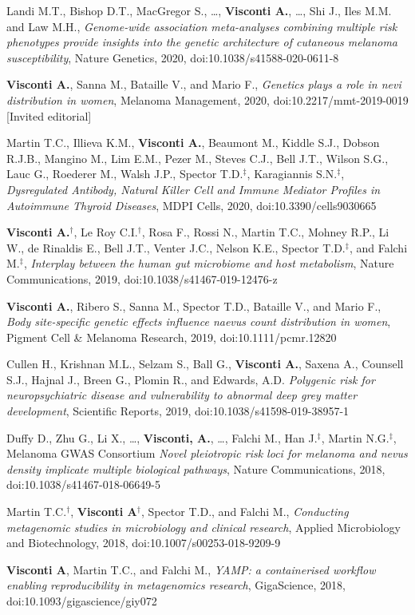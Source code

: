 \documentclass[a4paper,10pt]{article}
\begin{document}
{\begin{itemize}
		 Landi M.T., Bishop D.T., MacGregor S., \dots, \textbf{Visconti A.}, \dots, Shi J., Iles M.M. and Law M.H., \emph{Genome-wide association meta-analyses combining multiple risk phenotypes provide insights into the genetic architecture of cutaneous melanoma susceptibility}, Nature Genetics, 2020, doi:10.1038/s41588-020-0611-8

		 \textbf{Visconti A.}, Sanna M., Bataille V., and Mario F., \emph{Genetics plays a role in nevi distribution in women}, Melanoma Management, 2020, doi:10.2217/mmt-2019-0019 [Invited editorial]

		 Martin T.C., Illieva K.M., \textbf{Visconti A.}, Beaumont M., Kiddle S.J., Dobson R.J.B., Mangino M., Lim E.M., Pezer M., Steves C.J., Bell J.T., Wilson S.G., Lauc G., Roederer M., Walsh J.P., Spector T.D.$^{\textbf{$\ddag $}}$, Karagiannis S.N.$^{\textbf{$\ddag $}}$, \emph{Dysregulated Antibody, Natural Killer Cell and Immune Mediator Profiles in Autoimmune Thyroid Diseases}, MDPI Cells, 2020, doi:10.3390/cells9030665
		
		 \textbf{Visconti A.}$^{\textbf{$\dag $}}$, Le Roy C.I.$^{\textbf{$\dag $}}$, Rosa F., Rossi N., Martin T.C., Mohney R.P., Li W., de Rinaldis E., Bell J.T., Venter J.C., Nelson K.E., Spector T.D.$^{\textbf{$\ddag $}}$, and Falchi M.$^{\textbf{$\ddag $}}$, \emph{Interplay between the human gut microbiome and host metabolism}, Nature Communications, 2019, doi:10.1038/s41467-019-12476-z

		 \textbf{Visconti A.}, Ribero S., Sanna M., Spector T.D., Bataille V., and Mario F., \emph{Body site-specific genetic effects influence naevus count distribution in women}, Pigment Cell \& Melanoma Research, 2019, doi:10.1111/pcmr.12820
		
		 Cullen H., Krishnan M.L., Selzam S., Ball G., \textbf{Visconti A.}, Saxena A., Counsell S.J., Hajnal J., Breen G., Plomin R., and Edwards, A.D. \emph{Polygenic risk for neuropsychiatric disease and vulnerability to abnormal deep grey matter development}, Scientific Reports, 2019, doi:10.1038/s41598-019-38957-1
		
		 Duffy D., Zhu G., Li X., \dots, \textbf{Visconti, A.}, \dots, Falchi M., Han J.$^{\textbf{$\ddag $}}$, Martin N.G.$^{\textbf{$\ddag $}}$, Melanoma GWAS Consortium \emph{Novel pleiotropic risk loci for melanoma and nevus density implicate multiple biological pathways}, Nature Communications, 2018, doi:10.1038/s41467-018-06649-5
		
		 Martin T.C.$^{\textbf{$\dag $}}$, \textbf{Visconti A}$^{\textbf{$\dag $}}$, Spector T.D., and Falchi M., \emph{Conducting metagenomic studies in microbiology and clinical research}, Applied Microbiology and Biotechnology, 2018, doi:10.1007/s00253-018-9209-9

		 \textbf{Visconti A}, Martin T.C., and Falchi M., \emph{YAMP: a containerised workflow enabling reproducibility in metagenomics research}, GigaScience, 2018, doi:10.1093/gigascience/giy072
			
	 	\end{itemize}
	}
\end{document}

